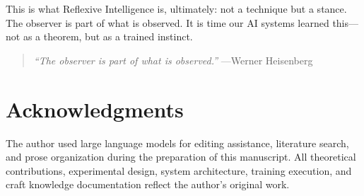 \documentclass[11pt,a4paper]{article}
\begin{document}
This is what Reflexive Intelligence is, ultimately: not a technique but a stance. The observer is part of what is observed. It is time our AI systems learned this---not as a theorem, but as a trained instinct.

\begin{quote}
\textit{``The observer is part of what is observed.''} ---Werner Heisenberg
\end{quote}

\section*{Acknowledgments}

The author used large language models for editing assistance, literature search, and prose organization during the preparation of this manuscript. All theoretical contributions, experimental design, system architecture, training execution, and craft knowledge documentation reflect the author's original work.



\end{document}
